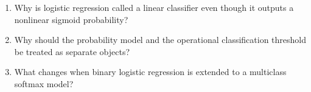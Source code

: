 

\begin{quickcheck}
\begin{enumerate}
  \item Why is logistic regression called a linear classifier even though it outputs a nonlinear sigmoid probability?
  \item Why should the probability model and the operational classification threshold be treated as separate objects?
  \item What changes when binary logistic regression is extended to a multiclass softmax model?
\end{enumerate}
\end{quickcheck}
